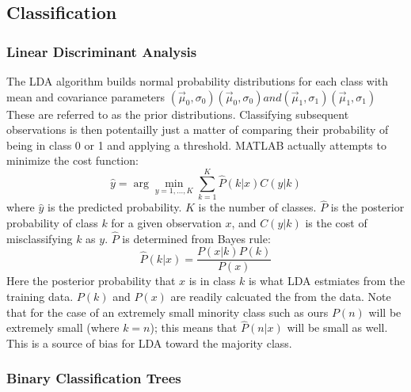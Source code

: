 \documentclass{article}
\begin{document}
\subsection{Classification}
\subsubsection{Linear Discriminant Analysis}
The LDA algorithm builds normal probability distributions for each class with mean and covariance parameters $\left({\vec {\mu }}_{0}, \sigma_{0} \right) \left({\vec {\mu }}_{0}, \sigma_{0}\right) and \left({\vec {\mu }}_{1},\sigma_{1}\right) \left({\vec {\mu }}_{1}, \sigma_{1}\right)$
These are referred to as the prior distributions. Classifying subsequent observations is then potentailly just a matter of comparing their probability of being in class 0 or 1 and applying a threshold.
MATLAB actually attempts to minimize the cost function:
\begin{equation}
\hat{y}=\arg\min_{y=1,...,K}\sum_{k=1}^{K}\hat{P}(k|x)C(y|k)
\end{equation}
where $\hat{y}$ is the predicted probability. $K$ is the number of classes. $\hat{P}$ is the posterior probability of class $k$ for a given observation $x$, and $C(y|k)$ is the cost of misclassifying $k$ as $y$.
$\hat{P}$ is determined from Bayes rule:
\begin{equation}
\hat{P}(k|x)=\frac{P(x|k)P(k)}{P(x)}
\end{equation}
Here the posterior probability that $x$ is in class $k$ is what LDA estmiates from the training data.
$P(k)$ and $P(x)$ are readily calcuated the from the data.
Note that for the case of an extremely small minority class such as ours $P(n)$ will be extremely small (where $k=n$); this means that $\hat{P}(n|x)$ will be small as well.
This is a source of bias for LDA toward the majority class.

\subsubsection{Binary Classification Trees}
\end{document}
